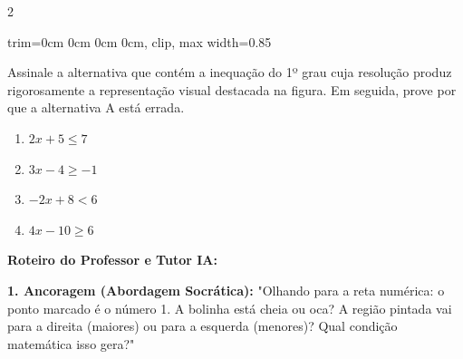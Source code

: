 \begin{multicols*}{2}
\begin{enunciadoLiteral}
\begin{center}
\begin{adjustbox}{trim=0cm 0cm 0cm 0cm, clip, max width=0.85\linewidth}
\end{adjustbox}
\end{center}

Assinale a alternativa que contém a inequação do 1º grau cuja resolução produz rigorosamente a representação visual destacada na figura. Em seguida, prove por que a alternativa A está errada.

\begin{enumerate}[label=\alph*), itemsep=\espacoAlt]
\item $ 2x + 5 \le 7 $
\item $ 3x - 4 \ge -1 $
\item $ -2x + 8 < 6 $
\item $ 4x - 10 \ge 6 $
\end{enumerate}
\end{enunciadoLiteral}

\ifgabarito
    \begin{tcolorbox}[colback=CorTitUm!5, colframe=CorTitUm, boxrule=1pt, arc=4pt, left=6pt, right=6pt, top=6pt, bottom=6pt]
    \small\textbf{\textcolor{CorTitUm}{Roteiro do Professor e Tutor IA:}}\par\vspace{0.1cm}
    \color{CinzaEscuro}
    \textbf{1. Ancoragem (Abordagem Socrática):} "Olhando para a reta numérica: o ponto marcado é o número 1. A bolinha está cheia ou oca? A região pintada vai para a direita (maiores) ou para a esquerda (menores)? Qual condição matemática isso gera?"\par\vspace{0.1cm}
    

\end{tcolorbox}
\end{multicols*}
